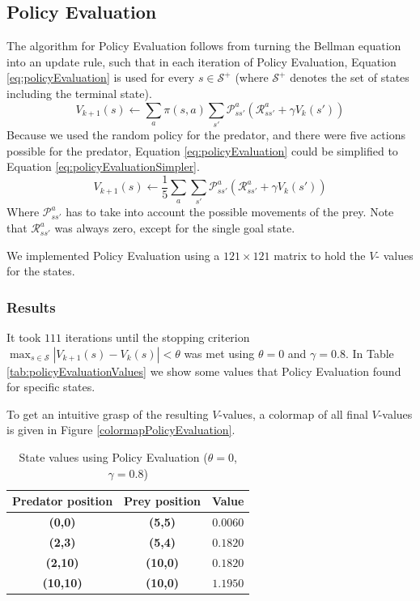 \documentclass{article}
\begin{document}
\subsection{ Policy Evaluation}
The algorithm for Policy Evaluation follows from turning the Bellman equation \cite{russel} into an update rule, such that in each iteration of Policy Evaluation, Equation \ref{eq:policyEvaluation} is used for every $s \in \mathcal S^{+}$ (where $\mathcal S^{+}$ denotes the set of states including the terminal state).
\begin{equation}\label{eq:policyEvaluation}
V_{k+1}(s) \leftarrow \sum_{a} \pi (s,a) \sum_{s'}  \mathcal P_{s s'}^{a} \left( \mathcal R_{s s'}^{a} 
+ \gamma V_{k}(s') \right) 
\end{equation}
Because we used the random policy for the predator, and there were five actions possible for the predator, Equation \ref{eq:policyEvaluation} could be simplified to Equation \ref{eq:policyEvaluationSimpler}.
\begin{equation}\label{eq:policyEvaluationSimpler}
V_{k+1}(s) \leftarrow \frac{1}{5} \sum_{a}  \sum_{s'}  \mathcal P_{s s'}^{a} \left( \mathcal R_{s s'}^{a} 
+ \gamma V_{k}(s') \right) 
\end{equation}
Where $\mathcal P_{s s'}^{a}$ has to take into account the possible movements of the prey. Note that $\mathcal R_{s s'}^{a}$ was always zero, except for the single goal state.

We implemented Policy Evaluation using a $121 \times 121$ matrix to hold the $V$- values for the states. 

\subsubsection{Results}
It took $111$ iterations until the stopping criterion $\max_{s \in \mathcal S} | V_{ k+1}(s) - V_{k}(s) | < \theta$ was met using $\theta = 0$ and $\gamma = 0.8$.
In Table \ref{tab:policyEvaluationValues} we show some values that Policy Evaluation found for specific states.

To get an intuitive grasp of the resulting $V$-values, a colormap of all final $V$-values is given in Figure \ref{colormapPolicyEvaluation}.

\begin{table}[hbt]
\centering
\label{tab:policyEvaluation}
\begin{tabular}{|c|c|c|}
\hline 
Predator position & Prey position & Value \\ 
\hline 
\textbf{(0,0)} & \textbf{(5,5)} &  $0.0060$		 \\ 
\hline 
\textbf{(2,3)} & \textbf{(5,4) }& $0.1820$ \\ 
\hline 
\textbf{(2,10)} & \textbf{(10,0) }&  $0.1820$ \\ 
\hline 
\textbf{(10,10)} & \textbf{(10,0)} & $1.1950$ \\ 
\hline 
\end{tabular} 
\caption{State values using Policy Evaluation ($\theta = 0$, $\gamma = 0.8$)}
\end{table}
\end{document}
